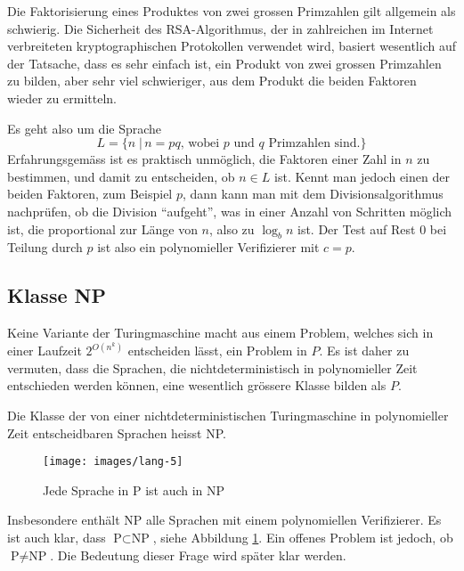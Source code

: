 \begin{beispiel}[Faktorisierung]
Die Faktorisierung eines Produktes von zwei grossen Primzahlen
gilt allgemein als schwierig. Die Sicherheit des RSA-Algorithmus,
der in zahlreichen im Internet verbreiteten kryptographischen
Protokollen verwendet wird, basiert wesentlich auf der Tatsache, dass
es sehr einfach ist, ein Produkt von zwei grossen Primzahlen zu
bilden, aber sehr viel schwieriger, aus dem Produkt die beiden
Faktoren wieder zu ermitteln.

Es geht also um die Sprache
\[
L
=
\{
n\;|\,\text{$n=pq$, wobei $p$ und $q$ Primzahlen sind}.
\}
\]
Erfahrungsgemäss ist es praktisch unmöglich, die Faktoren
einer Zahl in $n$ zu bestimmen, und damit zu entscheiden, ob
$n\in L$ ist. Kennt man jedoch einen der beiden Faktoren,
zum Beispiel $p$, dann kann man mit dem Divisionsalgorithmus
nachprüfen, ob die Division ``aufgeht'', was in einer Anzahl
von Schritten möglich ist, die proportional zur Länge von 
$n$, also zu $\log_b n$ ist. Der Test auf Rest 0 bei Teilung
durch $p$ ist also ein polynomieller Verifizierer mit $c=p$.
\end{beispiel}

\subsection{Klasse NP}
Keine Variante der Turingmaschine macht aus einem Problem,
welches sich in einer Laufzeit $2^{O(n^k)}$ entscheiden
lässt, ein Problem in $P$. Es ist daher zu vermuten,
dass die Sprachen, die nichtdeterministisch in polynomieller
Zeit entschieden werden können, eine wesentlich grössere
Klasse bilden als $P$.

\begin{definition}
%
Die Klasse der von einer nichtdeterministischen Turingmaschine
in polynomieller Zeit entscheidbaren Sprachen heisst NP.
\end{definition}

\begin{figure}
\begin{center}
\texttt{[image: images/lang-5]}
\end{center}
\caption{Jede Sprache in P ist auch in NP\label{psubsetnp}}
\end{figure}%

Insbesondere enthält NP alle Sprachen mit einem polynomiellen
Verifizierer. Es ist auch klar, dass $\text{P}\subset\text{NP}$,
siehe Abbildung \ref{psubsetnp}.
Ein offenes Problem ist jedoch, ob $\text{P}\ne \text{NP}$.
Die Bedeutung dieser Frage wird später klar werden.

